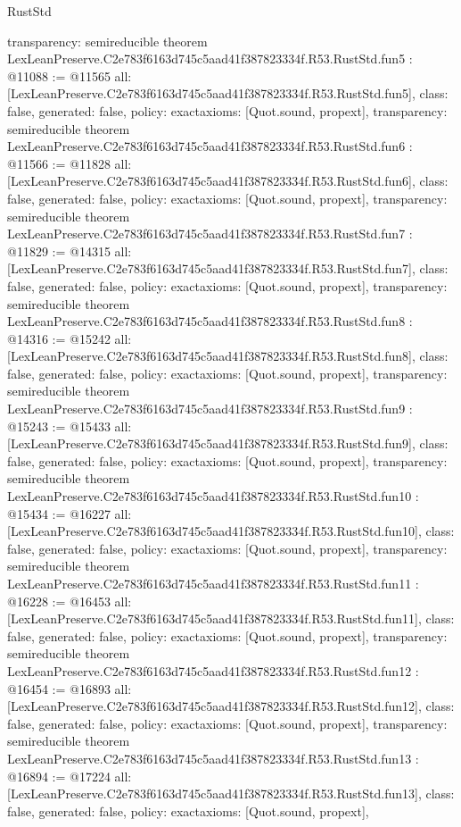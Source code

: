\begin{lexlean}{RustStd}
\begin{coremodule}
{  transparency: semireducible
}
theorem LexLeanPreserve.C2e783f6163d745c5aad41f387823334f.R53.RustStd.fun5 : @11088 := @11565 {
  all: [LexLeanPreserve.C2e783f6163d745c5aad41f387823334f.R53.RustStd.fun5],
  class: false,
  generated: false,
  policy: exact{axioms: [Quot.sound, propext]},
  transparency: semireducible
}
theorem LexLeanPreserve.C2e783f6163d745c5aad41f387823334f.R53.RustStd.fun6 : @11566 := @11828 {
  all: [LexLeanPreserve.C2e783f6163d745c5aad41f387823334f.R53.RustStd.fun6],
  class: false,
  generated: false,
  policy: exact{axioms: [Quot.sound, propext]},
  transparency: semireducible
}
theorem LexLeanPreserve.C2e783f6163d745c5aad41f387823334f.R53.RustStd.fun7 : @11829 := @14315 {
  all: [LexLeanPreserve.C2e783f6163d745c5aad41f387823334f.R53.RustStd.fun7],
  class: false,
  generated: false,
  policy: exact{axioms: [Quot.sound, propext]},
  transparency: semireducible
}
theorem LexLeanPreserve.C2e783f6163d745c5aad41f387823334f.R53.RustStd.fun8 : @14316 := @15242 {
  all: [LexLeanPreserve.C2e783f6163d745c5aad41f387823334f.R53.RustStd.fun8],
  class: false,
  generated: false,
  policy: exact{axioms: [Quot.sound, propext]},
  transparency: semireducible
}
theorem LexLeanPreserve.C2e783f6163d745c5aad41f387823334f.R53.RustStd.fun9 : @15243 := @15433 {
  all: [LexLeanPreserve.C2e783f6163d745c5aad41f387823334f.R53.RustStd.fun9],
  class: false,
  generated: false,
  policy: exact{axioms: [Quot.sound, propext]},
  transparency: semireducible
}
theorem LexLeanPreserve.C2e783f6163d745c5aad41f387823334f.R53.RustStd.fun10 : @15434 := @16227 {
  all: [LexLeanPreserve.C2e783f6163d745c5aad41f387823334f.R53.RustStd.fun10],
  class: false,
  generated: false,
  policy: exact{axioms: [Quot.sound, propext]},
  transparency: semireducible
}
theorem LexLeanPreserve.C2e783f6163d745c5aad41f387823334f.R53.RustStd.fun11 : @16228 := @16453 {
  all: [LexLeanPreserve.C2e783f6163d745c5aad41f387823334f.R53.RustStd.fun11],
  class: false,
  generated: false,
  policy: exact{axioms: [Quot.sound, propext]},
  transparency: semireducible
}
theorem LexLeanPreserve.C2e783f6163d745c5aad41f387823334f.R53.RustStd.fun12 : @16454 := @16893 {
  all: [LexLeanPreserve.C2e783f6163d745c5aad41f387823334f.R53.RustStd.fun12],
  class: false,
  generated: false,
  policy: exact{axioms: [Quot.sound, propext]},
  transparency: semireducible
}
theorem LexLeanPreserve.C2e783f6163d745c5aad41f387823334f.R53.RustStd.fun13 : @16894 := @17224 {
  all: [LexLeanPreserve.C2e783f6163d745c5aad41f387823334f.R53.RustStd.fun13],
  class: false,
  generated: false,
  policy: exact{axioms: [Quot.sound, propext]},
}
\end{coremodule}
\end{lexlean}
